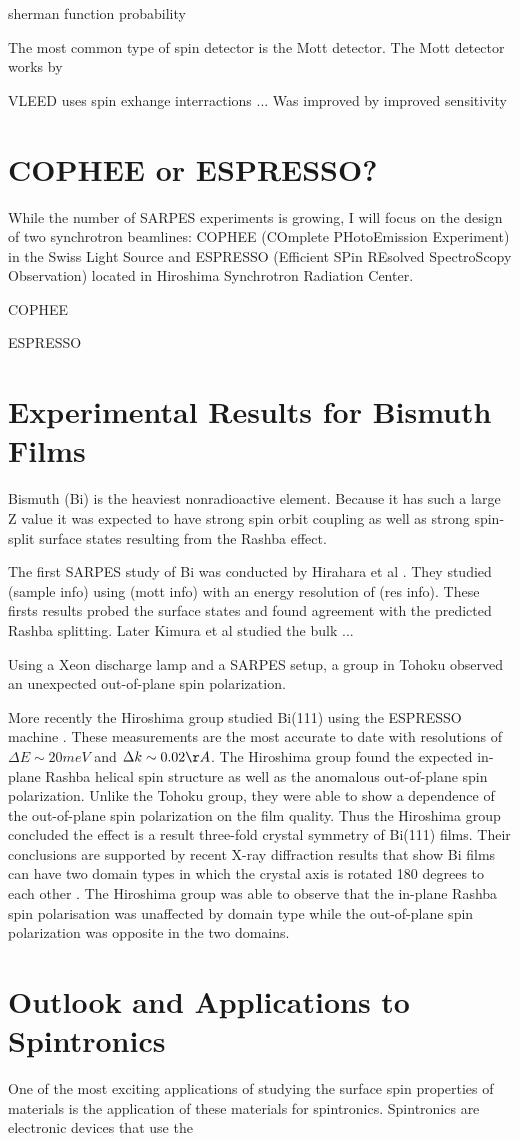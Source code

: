 \documentclass[12pt]{article}
\begin{document}
sherman function
probability

The most common type of spin detector is the Mott detector.
The Mott detector works by

VLEED uses spin exhange interractions ...
Was improved by \cite{Bertacco}
improved sensitivity

\section{COPHEE or ESPRESSO?}
While the number of SARPES experiments is growing, I will focus on the design of two synchrotron beamlines:  COPHEE (COmplete PHotoEmission Experiment) in the Swiss Light Source and ESPRESSO (Efficient SPin REsolved SpectroScopy Observation) located in Hiroshima Synchrotron Radiation Center.

COPHEE 

ESPRESSO
\section{Experimental Results for Bismuth Films}
Bismuth (Bi) is the heaviest nonradioactive element.
Because it has such a large Z value it was expected to have strong spin orbit coupling as well as strong spin-split surface states resulting from the Rashba effect.

The first SARPES study of Bi was conducted by Hirahara et al \cite{Hirahara}.
They studied (sample info) using (mott info) with an energy resolution of (res info).
These firsts results probed the surface states and found agreement with the predicted Rashba splitting.
Later Kimura et al studied the bulk ...

Using a Xeon discharge lamp and a SARPES setup, a group in Tohoku observed an unexpected out-of-plane spin polarization\cite{Takayama}.

More recently the Hiroshima group studied Bi(111) using the ESPRESSO machine \cite{Miyahara}.
These measurements are the most accurate to date with resolutions of $\Delta E\sim20meV$ and $\Delta k\sim0.02\AA$.
The Hiroshima group found the expected in-plane Rashba helical spin structure as well as the anomalous out-of-plane spin polarization.
Unlike the Tohoku group, they were able to show a dependence of the out-of-plane spin polarization on the film quality.
Thus the Hiroshima group concluded the effect is a result three-fold crystal symmetry of Bi(111) films.
Their conclusions are supported by recent X-ray diffraction results that show Bi films can have two domain types in which the crystal axis is rotated 180 degrees to each other \cite{Shirasawa}.
The Hiroshima group was able to observe that the in-plane Rashba spin polarisation was unaffected by domain type while the out-of-plane spin polarization was opposite in the two domains.




\section{Outlook and Applications to Spintronics}
One of the most exciting applications of studying the surface spin properties of materials is the application of these materials for spintronics.
Spintronics are electronic devices that use the





\end{document}
